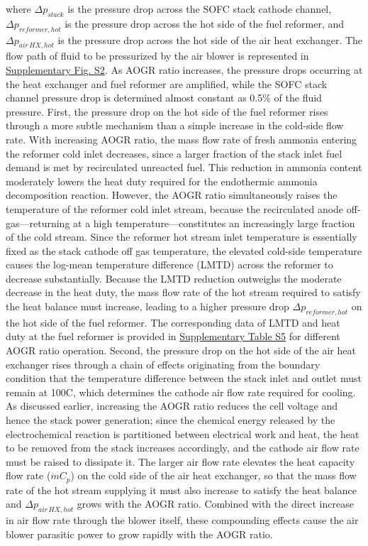 \documentclass[a4paper,10pt]{cas-dc} %
\begin{document}
where \(\Delta p_{stack}\) is the pressure drop across the SOFC stack cathode channel, \(\Delta p_{reformer,hot}\) is the pressure drop across the hot side of the fuel reformer, and \(\Delta p_{air\,HX,hot}\) is the pressure drop across the hot side of the air heat exchanger.
The flow path of fluid to be pressurized by the air blower is represented in \href{Supplementary.pdf}{Supplementary Fig. S2}.
As AOGR ratio increases, the pressure drops occurring at the heat exchanger and fuel reformer are amplified, while the SOFC stack channel pressure drop is determined almost constant as 0.5\% of the fluid pressure.
First, the pressure drop on the hot side of the fuel reformer rises through a more subtle mechanism than a simple increase in the cold-side flow rate.
With increasing AOGR ratio, the mass flow rate of fresh ammonia entering the reformer cold inlet decreases, since a larger fraction of the stack inlet fuel demand is met by recirculated unreacted fuel.
This reduction in ammonia content moderately lowers the heat duty required for the endothermic ammonia decomposition reaction.
However, the AOGR ratio simultaneously raises the temperature of the reformer cold inlet stream, because the recirculated anode off-gas---returning at a high temperature---constitutes an increasingly large fraction of the cold stream.
Since the reformer hot stream inlet temperature is essentially fixed as the stack cathode off gas temperature, the elevated cold-side temperature causes the log-mean temperature difference (LMTD) across the reformer to decrease substantially.
Because the LMTD reduction outweighs the moderate decrease in the heat duty, the mass flow rate of the hot stream required to satisfy the heat balance must increase, leading to a higher pressure drop \(\Delta p_{reformer,hot}\) on the hot side of the fuel reformer.
The corresponding data of LMTD and heat duty at the fuel reformer is provided in \href{Supplementary.pdf}{Supplementary Table S5} for different AOGR ratio operation.
Second, the pressure drop on the hot side of the air heat exchanger rises through a chain of effects originating from the boundary condition that the temperature difference between the stack inlet and outlet must remain at 100\textdegree C, which determines the cathode air flow rate required for cooling.
As discussed earlier, increasing the AOGR ratio reduces the cell voltage and hence the stack power generation; since the chemical energy released by the electrochemical reaction is partitioned between electrical work and heat, the heat to be removed from the stack increases accordingly, and the cathode air flow rate must be raised to dissipate it.
The larger air flow rate elevates the heat capacity flow rate (\(\dot{m}C_{p}\)) on the cold side of the air heat exchanger, so that the mass flow rate of the hot stream supplying it must also increase to satisfy the heat balance and \(\Delta p_{air\,HX,hot}\) grows with the AOGR ratio.
Combined with the direct increase in air flow rate through the blower itself, these compounding effects cause the air blower parasitic power to grow rapidly with the AOGR ratio.
\end{document}
